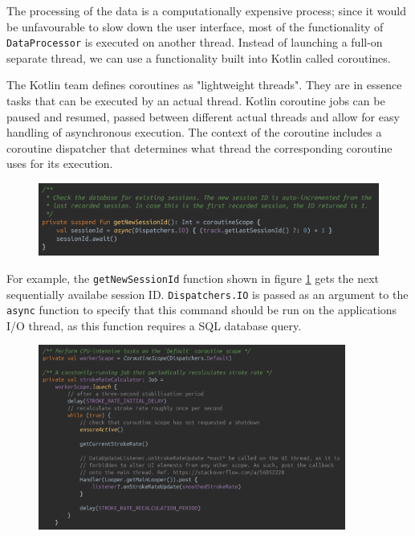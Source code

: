 \documentclass[11pt,twoside,a4paper]{report}
\begin{document}
The processing of the data is a computationally expensive process; since it would be unfavourable to slow down the user interface, most of the functionality of \texttt{DataProcessor} is executed on another thread. Instead of launching a full-on separate thread, we can use a functionality built into Kotlin called coroutines. 

The Kotlin team defines coroutines as "lightweight threads". They are in essence tasks that can be executed by an actual thread. Kotlin coroutine jobs can be paused and resumed, passed between different actual threads and allow for easy handling of asynchronous execution. The context of the coroutine includes a coroutine dispatcher that determines what thread the corresponding coroutine uses for its execution.\cite{kotlin_dispatchers}

\begin{figure}[h!]
  \centering
  \includegraphics[width=1.0\textwidth]{code-dataProcessor-getSessionId.png}
  \caption{}
  \label{fig:dataProcessorGetSessionId}
\end{figure}

For example, the \texttt{getNewSessionId} function shown in figure \ref{fig:dataProcessorGetSessionId} gets the next sequentially availabe session ID. \texttt{Dispatchers.IO} is passed as an argument to the \texttt{async} function to specify that this command should be run on the applications I/O thread, as this function requires a SQL database query.

\begin{figure}[h!]
  \centering
  \includegraphics[width=0.9\textwidth]{code-dataProcessor-strokeRateCalculator.png}
  \caption{}
  \label{fig:strokeRateCalculator}
\end{figure}
\end{document}
